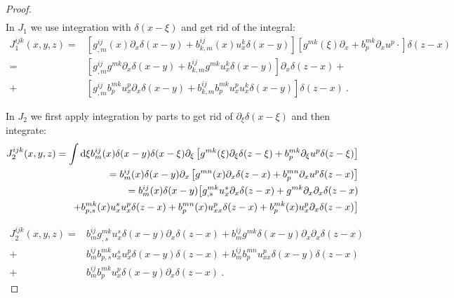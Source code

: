 \begin{proof}
\begin{align*}
    \end{align*}
    In $J_1$ we use integration with $\delta(x-\xi)$ and get rid of the integral:
    \begin{align*}
        J_1^{ijk}(x,y,z) =& \left[ g^{ij}_{,m}(x) \partial_x \delta(x-y) + b^{ij}_{k,m}(x) u^k_x \delta(x-y) \right] 
        \left[ g^{mk}(\xi) \partial_x + b^{mk}_p \partial_x u^p \cdot \right] \delta(z-x)
        \\
        =& \left[ g^{ij}_{,m} g^{mk} \partial_x \delta(x-y) + b^{ij}_{k,m} g^{mk} u^k_x \delta(x-y) \right] \partial_x \delta(z-x) + 
        \\
        +& \left[ g^{ij}_{,m} b^{mk}_p u^p_x \partial_x \delta(x-y) + b^{ij}_{k,m} b^{mk}_p u_x^p  u_x^k \delta(x-y) \right] \delta(z-x) \:.
    \end{align*}

    In $J_2$ we first apply integration by parts to get rid of $\partial_\xi \delta(x-\xi)$ and then integrate:
    \begin{align*}
        J_2^{ijk}(x,y,z) = \int \mathrm{d} \xi b^{ij}_m(x) \delta(x-y) \delta(x-\xi) \partial_\xi \left[ g^{mk}(\xi) \partial_\xi \delta(z-\xi) + b^{mk}_p \partial_\xi u^p \delta(z-\xi) \right]
        \\ = b^{ij}_m(x) \delta(x-y) \partial_x \left[ g^{mn}(x) \partial_x \delta(z-x) + b^{mn}_p \partial_x u^p \delta(z-x) \right]
        \\ = b^{ij}_m(x) \delta(x-y) \big[ g^{mk}_{,s} u^s_x \partial_x \delta (z-x) + g^{mk} \partial_x \partial_x \delta (z-x) 
        \\ + b^{mk}_{p,s}(x) u^s_x u^p_x \delta (z-x) + b^{mn}_{p}(x) u^p_{xx} \delta (z-x) + b^{mk}_{p}(x) u^p_x \partial_x \delta (z-x) \big]
    \end{align*}

    \begin{align*}
        J_2^{ijk}(x,y,z) =& b^{ij}_m g^{mk}_{,s} u^s_x \delta (x-y) \partial_x \delta (z-x) 
        + b^{ij}_m g^{mk} \delta(x-y) \partial_x \partial_x \delta (z-x) 
        \\ +& b^{ij}_m b^{mk}_{p,s} u^s_x u^p_x \delta (x-y) \delta (z-x)
        + b^{ij}_m b^{mn}_p u^p_{xx} \delta (x-y) \delta(z-x) 
        \\ +& b^{ij}_m b^{mk}_p u^p_x \delta(x-y) \partial_x \delta(z-x) \:.
    \end{align*}


\end{proof}
